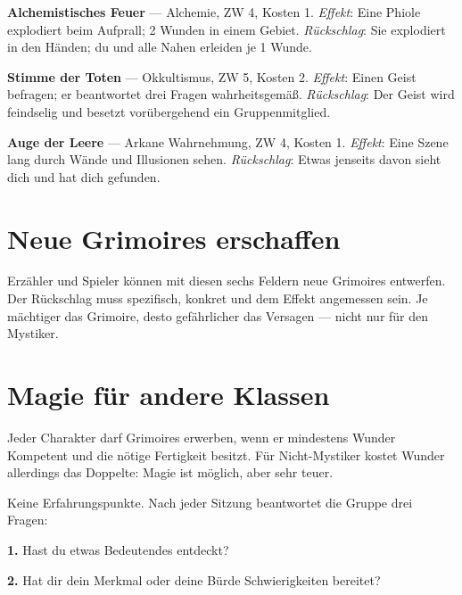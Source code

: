\documentclass[10pt,a4paper]{article}
\begin{document}
\textbf{Alchemistisches Feuer} — Alchemie, ZW 4, Kosten 1. \textit{Effekt}: Eine Phiole explodiert beim Aufprall; 2 Wunden in einem Gebiet. \textit{Rückschlag}: Sie explodiert in den Händen; du und alle Nahen erleiden je 1 Wunde.

\textbf{Stimme der Toten} — Okkultismus, ZW 5, Kosten 2. \textit{Effekt}: Einen Geist befragen; er beantwortet drei Fragen wahrheitsgemäß. \textit{Rückschlag}: Der Geist wird feindselig und besetzt vorübergehend ein Gruppenmitglied.

\textbf{Auge der Leere} — Arkane Wahrnehmung, ZW 4, Kosten 1. \textit{Effekt}: Eine Szene lang durch Wände und Illusionen sehen. \textit{Rückschlag}: Etwas jenseits davon sieht dich und hat dich gefunden.

\section*{Neue Grimoires erschaffen}
Erzähler und Spieler können mit diesen sechs Feldern neue Grimoires entwerfen. Der Rückschlag muss spezifisch, konkret und dem Effekt angemessen sein. Je mächtiger das Grimoire, desto gefährlicher das Versagen — nicht nur für den Mystiker.

\section*{Magie für andere Klassen}
Jeder Charakter darf Grimoires erwerben, wenn er mindestens Wunder Kompetent und die nötige Fertigkeit besitzt. Für Nicht-Mystiker kostet Wunder allerdings das Doppelte: Magie ist möglich, aber sehr teuer.

Keine Erfahrungspunkte. Nach jeder Sitzung beantwortet die Gruppe drei Fragen:

\textbf{1.} Hast du etwas Bedeutendes entdeckt?

\textbf{2.} Hat dir dein Merkmal oder deine Bürde Schwierigkeiten bereitet?
\end{document}
